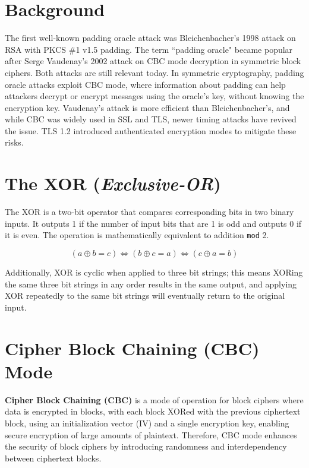 \documentclass[conference]{IEEEtran}
\begin{document}
\section{Background}
The first well-known padding oracle attack was Bleichenbacher's 1998 attack on RSA with PKCS \#1 v1.5 padding. The term ``padding oracle" became popular after Serge Vaudenay's 2002 attack on CBC mode decryption in symmetric block ciphers. Both attacks are still relevant today. In symmetric cryptography, padding oracle attacks exploit CBC mode, where information about padding can help attackers decrypt or encrypt messages using the oracle's key, without knowing the encryption key. Vaudenay's attack is more efficient than Bleichenbacher's, and while CBC was widely used in SSL and TLS, newer timing attacks have revived the issue. TLS 1.2 introduced authenticated encryption modes to mitigate these risks.


\section{The XOR (\textit{Exclusive-OR})}
The XOR is a two-bit operator that compares corresponding bits in two binary inputs. It outputs 1 if the number of input bits that are 1 is odd and outputs 0 if it is even. The operation is mathematically equivalent to addition \texttt{mod} 2.

$$\left(a \oplus b = c\right) \Leftrightarrow \left(b \oplus c = a\right) \Leftrightarrow \left(c \oplus a = b\right)$$

Additionally, XOR is cyclic when applied to three bit strings; this means XORing the same three bit strings in any order results in the same output, and applying XOR repeatedly to the same bit strings will eventually return to the original input.


\section{Cipher Block Chaining (CBC) Mode}
\textbf{Cipher Block Chaining (CBC)} is a mode of operation for block ciphers where data is encrypted in blocks, with each block XORed with the previous ciphertext block, using an initialization vector (IV) and a single encryption key, enabling secure encryption of large amounts of plaintext. Therefore, CBC mode enhances the security of block ciphers by introducing randomness and interdependency between ciphertext blocks. 
\end{document}
